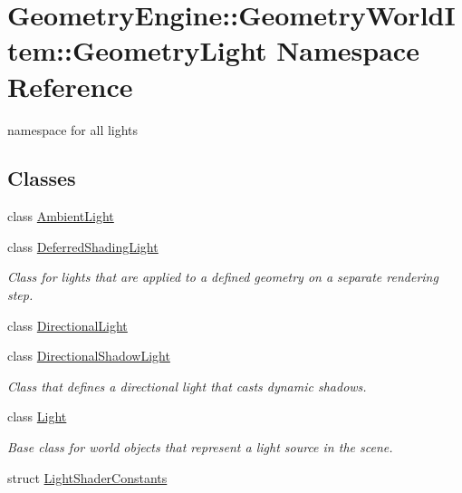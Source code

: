 \hypertarget{namespace_geometry_engine_1_1_geometry_world_item_1_1_geometry_light}{}\section{Geometry\+Engine\+::Geometry\+World\+Item\+::Geometry\+Light Namespace Reference}
\label{namespace_geometry_engine_1_1_geometry_world_item_1_1_geometry_light}


namespace for all lights  


\subsection*{Classes}
\begin{DoxyCompactItemize}
\item 
class \mbox{\hyperlink{class_geometry_engine_1_1_geometry_world_item_1_1_geometry_light_1_1_ambient_light}{Ambient\+Light}}
\item 
class \mbox{\hyperlink{class_geometry_engine_1_1_geometry_world_item_1_1_geometry_light_1_1_deferred_shading_light}{Deferred\+Shading\+Light}}
\begin{DoxyCompactList}\small\item\em Class for lights that are applied to a defined geometry on a separate rendering step. \end{DoxyCompactList}\item 
class \mbox{\hyperlink{class_geometry_engine_1_1_geometry_world_item_1_1_geometry_light_1_1_directional_light}{Directional\+Light}}
\item 
class \mbox{\hyperlink{class_geometry_engine_1_1_geometry_world_item_1_1_geometry_light_1_1_directional_shadow_light}{Directional\+Shadow\+Light}}
\begin{DoxyCompactList}\small\item\em Class that defines a directional light that casts dynamic shadows. \end{DoxyCompactList}\item 
class \mbox{\hyperlink{class_geometry_engine_1_1_geometry_world_item_1_1_geometry_light_1_1_light}{Light}}
\begin{DoxyCompactList}\small\item\em Base class for world objects that represent a light source in the scene. \end{DoxyCompactList}\item 
struct \mbox{\hyperlink{struct_geometry_engine_1_1_geometry_world_item_1_1_geometry_light_1_1_light_shader_constants}{Light\+Shader\+Constants}}

\end{DoxyCompactItemize}
